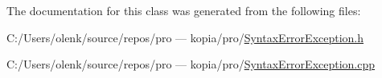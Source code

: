 The documentation for this class was generated from the following files\+:\begin{DoxyCompactItemize}
\item 
C\+:/\+Users/olenk/source/repos/pro — kopia/pro/\mbox{\hyperlink{_syntax_error_exception_8h}{Syntax\+Error\+Exception.\+h}}\item 
C\+:/\+Users/olenk/source/repos/pro — kopia/pro/\mbox{\hyperlink{_syntax_error_exception_8cpp}{Syntax\+Error\+Exception.\+cpp}}\end{DoxyCompactItemize}
